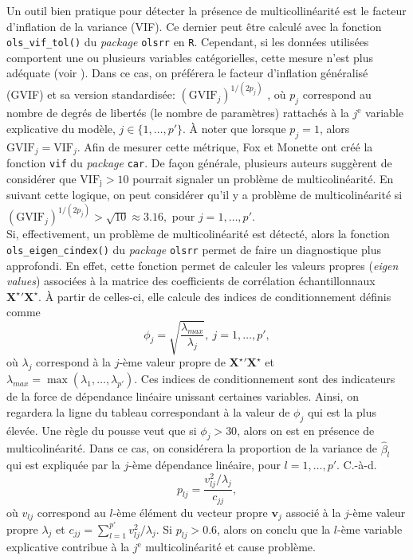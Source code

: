 \documentclass{article}
\begin{document}
Un outil bien pratique pour détecter la présence de multicollinéarité est le facteur d’inflation de la variance (VIF). Ce dernier peut être calculé avec la fonction \texttt{ols\_vif\_tol()} du \textit{package} \texttt{olsrr} en \texttt{R}. Cependant, si les données utilisées comportent une ou plusieurs variables catégorielles, cette mesure n'est plus adéquate (voir \cite{fox1992generalized}). Dans ce cas, on préférera le facteur d'inflation généralisé (GVIF) et sa version standardisée: $(\mathrm{GVIF}_j)^{1/(2 p_j)}$ , où $p_j$ correspond au nombre de degrés de libertés (le nombre de paramètres) rattachés à la $j^\mathrm{e}$ variable explicative du modèle, $j\in \{1,\dots,p'\}$. 
À noter que lorsque $p_j=1$, alors $\mathrm{GVIF}_j = \mathrm{VIF}_j$.
%
Afin de mesurer cette métrique, Fox et Monette ont créé la fonction \texttt{vif} du \textit{package} \texttt{car}. De façon générale, plusieurs auteurs suggèrent de considérer que $\mathrm{VIF_j}>10$ pourrait signaler un problème de multicolinéarité. En suivant cette logique, on peut considérer qu'il y a problème de multicolinéarité si $(\mathrm{GVIF}_j)^{1/(2 p_j)} > \sqrt{10} \approx 3.16,$ pour $j=1,\dots,p'$.\\

Si, effectivement, un problème de multicolinéarité est détecté, alors la fonction \texttt{ols\_eigen\_cindex()} du \textit{package} \texttt{olsrr} permet de faire un diagnostique plus approfondi. En effet, cette fonction permet de calculer les valeurs propres (\textit{eigen values}) associées à la matrice des coefficients de corrélation échantillonnaux $\boldsymbol{X^{\star}}'\boldsymbol{X^{\star}}$. 
%
À partir de celles-ci, elle calcule des indices de conditionnement définis comme
$$\phi_j = \sqrt{\frac{\lambda_{max}}{\lambda_j}},\ j=1,\dots,p',$$
où $\lambda_j$ correspond à la $j$-ème valeur propre de $\boldsymbol{X^{\star}}'\boldsymbol{X^{\star}}$ et $\lambda_{max}=\max(\lambda_1,\dots,\lambda_{p'}).$
Ces indices de conditionnement sont des indicateurs de la force de dépendance linéaire unissant certaines variables.
%
Ainsi, on regardera la ligne du tableau correspondant à la valeur de $\phi_j$ qui est la plus élevée. Une règle du pousse veut que si $\phi_j > 30$, alors on est en présence de multicolinéarité. Dans ce cas, on considérera la  proportion de la variance de $\hat{\beta}_l$ qui est expliquée par la $j$-ème dépendance linéaire, pour $l=1,\dots,p'$. C.-à-d. 
$$ p_{lj} = \frac{v_{lj}^2/\lambda_j}{c_{jj}},$$
où $v_{lj}$ correspond au $l$-ème élément du vecteur propre $\boldsymbol{v}_j$ associé à la $j$-ème valeur propre $\lambda_j$ et $c_{jj} = \sum_{l=1}^{p'}v_{lj}^2/\lambda_j$. 
Si $p_{lj} > 0.6$, alors on conclu que la $l$-ème variable explicative contribue à la $j^\mathrm{e}$ multicolinéarité et cause problème.\\
\end{document}
